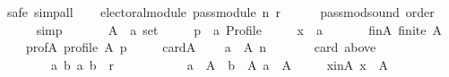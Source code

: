 \begin{isabellebody}
\isamarkupfalse%
\ {\isacharparenleft}{\kern0pt}safe{\isacharcomma}{\kern0pt}\ simp{\isacharunderscore}{\kern0pt}all{\isacharparenright}{\kern0pt}\isanewline
\ \ \isamarkupfalse%
\ {\isachardoublequoteopen}electoral{\isacharunderscore}{\kern0pt}module\ {\isacharparenleft}{\kern0pt}pass{\isacharunderscore}{\kern0pt}module\ n\ r{\isacharparenright}{\kern0pt}{\isachardoublequoteclose}\isanewline
\ \ \ \ \isamarkupfalse%
\ pass{\isacharunderscore}{\kern0pt}mod{\isacharunderscore}{\kern0pt}sound\ order\isanewline
\ \ \ \ \isamarkupfalse%
\ simp\isanewline
{}\isamarkupfalse%
\isanewline
\ \ \isamarkupfalse%
\isanewline
\ \ \ \ A\ {\isacharcolon}{\kern0pt}{\isacharcolon}{\kern0pt}\ {\isachardoublequoteopen}{\isacharprime}{\kern0pt}a\ set{\isachardoublequoteclose}\ \isanewline
\ \ \ \ p\ {\isacharcolon}{\kern0pt}{\isacharcolon}{\kern0pt}\ {\isachardoublequoteopen}{\isacharprime}{\kern0pt}a\ Profile{\isachardoublequoteclose}\ \isanewline
\ \ \ \ x\ {\isacharcolon}{\kern0pt}{\isacharcolon}{\kern0pt}\ {\isachardoublequoteopen}{\isacharprime}{\kern0pt}a{\isachardoublequoteclose}\isanewline
\ \ \isamarkupfalse%
\isanewline
\ \ \ \ fin{\isacharunderscore}{\kern0pt}A{\isacharcolon}{\kern0pt}\ {\isachardoublequoteopen}finite\ A{\isachardoublequoteclose}\ \isanewline
\ \ \ \ prof{\isacharunderscore}{\kern0pt}A{\isacharcolon}{\kern0pt}\ {\isachardoublequoteopen}profile\ A\ p{\isachardoublequoteclose}\ \isanewline
\ \ \ \ card{\isacharunderscore}{\kern0pt}A{\isacharcolon}{\kern0pt}\isanewline
\ \ \ \ {\isachardoublequoteopen}{\isacharbraceleft}{\kern0pt}a\ {\isasymin}\ A{\isachardot}{\kern0pt}\ n\ {\isacharless}{\kern0pt}\isanewline
\ \ \ \ \ \ card\ {\isacharparenleft}{\kern0pt}above\isanewline
\ \ \ \ \ \ \ \ {\isacharbraceleft}{\kern0pt}{\isacharparenleft}{\kern0pt}a{\isacharcomma}{\kern0pt}\ b{\isacharparenright}{\kern0pt}{\isachardot}{\kern0pt}\ {\isacharparenleft}{\kern0pt}a{\isacharcomma}{\kern0pt}\ b{\isacharparenright}{\kern0pt}\ {\isasymin}\ r\ {\isasymand}\isanewline
\ \ \ \ \ \ \ \ \ \ a\ {\isasymin}\ A\ {\isasymand}\ b\ {\isasymin}\ A{\isacharbraceright}{\kern0pt}\ a{\isacharparenright}{\kern0pt}{\isacharbraceright}{\kern0pt}\ {\isacharequal}{\kern0pt}\ A{\isachardoublequoteclose}\ \isanewline
\ \ \ \ x{\isacharunderscore}{\kern0pt}in{\isacharunderscore}{\kern0pt}A{\isacharcolon}{\kern0pt}\ {\isachardoublequoteopen}x\ {\isasymin}\ A{\isachardoublequoteclose}\isanewline

\end{isabellebody}
